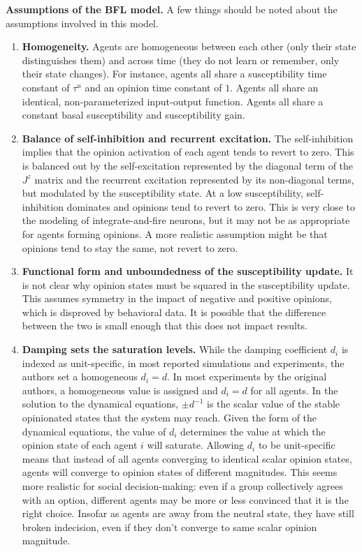 \documentclass[]{article}
\begin{document}
\textbf{Assumptions of the BFL model.} A few things should be noted about the assumptions involved in this model.
\begin{enumerate}
	\item \textbf{Homogeneity.} Agents are homogeneous between each other (only their state distinguishes them) and across time (they do not learn or remember, only their state changes). For instance, agents all share a susceptibility time constant of $\tau^u$ and an opinion time constant of $1$. Agents all share an identical, non-parameterized input-output function. Agents all share a constant basal susceptibility and susceptibility gain. 
	\item \textbf{Balance of self-inhibition and recurrent excitation.} The self-inhibition implies that the opinion activation of each agent tends to revert to zero. This is balanced out by the self-excitation represented by the diagonal term of the $J^z$ matrix and the recurrent excitation represented by its non-diagonal terms, but modulated by the susceptibility state. At a low susceptibility, self-inhibition dominates and opinions tend to revert to zero. This is very close to the modeling of integrate-and-fire neurons, but it may not be as appropriate for agents forming opinions. A more realistic assumption might be that opinions tend to stay the same, not revert to zero.
	\item \textbf{Functional form and unboundedness of the susceptibility update.} It is not clear why opinion states must be squared in the susceptibility update. This assumes symmetry in the impact of negative and positive opinions, which is disproved by behavioral data. It is possible that the difference between the two is small enough that this does not impact results. 
	\item \textbf{Damping sets the saturation levels.} While the damping coefficient $d_i$ is indexed as unit-specific, in most reported simulations and experiments, the authors set a homogeneous $d_i=d$. In most experiments by the original authors, a homogeneous value is assigned and $d_i = d$ for all agents. In the solution to the dynamical equations, $\pm d^{-1}$ is the scalar value of the stable opinionated states that the system may reach. Given the form of the dynamical equations, the value of $d_i$ determines the value at which the opinion state of each agent $i$ will saturate. Allowing $d_i$ to be unit-specific means that instead of all agents converging to identical scalar opinion states, agents will converge to opinion states of different magnitudes. This seems more realistic for social decision-making: even if a group collectively agrees with an option, different agents may be more or less convinced that it is the right choice. Insofar as agents are away from the neutral state, they have still broken indecision, even if they don't converge to same scalar opinion magnitude. 
\end{enumerate}
\end{document}
